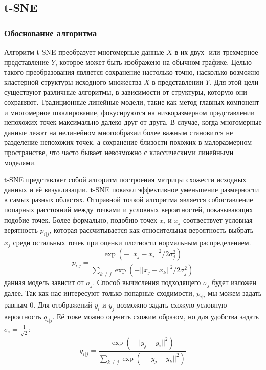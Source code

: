 \subsection{t-SNE}

\subsubsection{Обоснование алгоритма}

Алгоритм t-SNE преобразует многомерные данные $X$ в их двух- или трехмерное представление $Y$, которое может быть изображено на обычном графике. Целью такого преобразования является сохранение настолько точно, насколько возможно кластерной структуры исходного множества $X$ в представлении $Y$. Для этой цели существуют различные алгоритмы, в зависимости от структуры, которую они сохраняют. Традиционные линейные модели, такие как метод главных компонент и многомерное шкалирование, фокусируются на низкоразмерном представлении непохожих точек максимально далеко друг от друга. В случае, когда многомерные данные лежат на нелинейном многообразии более важным становится не разделение непохожих точек, а сохранение близости похожих в малоразмерном пространстве, что часто бывает невозможно с классическими линейными моделями.

t-SNE представляет собой алгоритм построения матрицы схожести исходных данных и её визуализации. t-SNE показал эффективное уменьшение размерности в самых разных областях\cite{maaten2008visualizing}. Отправной точкой алгоритма является собоставление попарных расстояний между точками и условных вероятностей, показывающих подобие точек. Более формально, подобию точек $x_i$ и $x_j$ соотвествует условная верятность $p_{i|j}$, которая рассчитывается как относительная вероятность выбрать $x_j$ среди остальных точек при оценки плотности нормальным распределением. 
\begin{equation}
	p_{i|j} = \frac{\exp(-||x_j - x_i||^2 / 2 \sigma_j^2)}{\sum_{k \neq j}\exp(-||x_j - x_k||^2 / 2 \sigma_j^2)}
\end{equation}
данная модель зависит от $\sigma_j$. Способ вычисления подходящего $\sigma_j$ будет изложен далее. Так как нас интересуют только попарные сходимости, $p_{i|i}$ мы можем задать равным 0. Для отображений $y_i$ и $y_j$ возможно задать схожую условную вероятность $q_{i|j}$. Её тоже можно оценить схожим образом, но для удобства задать $\sigma_i = \frac{1}{\sqrt{2}}$:
\begin{equation}
		q_{i|j} = \frac{\exp(-||y_j - y_i||^2)}{\sum_{k \neq j}\exp(-||y_j - y_k||^2)}
\end{equation}

